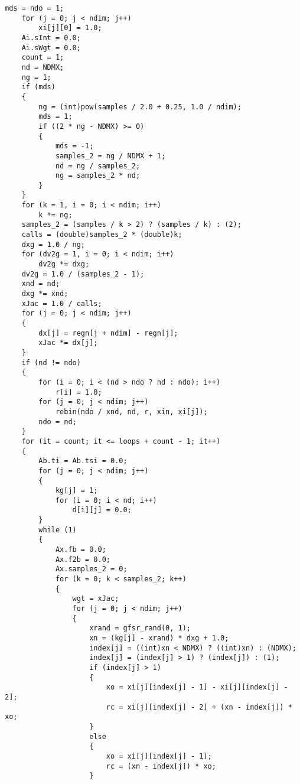 \begin{lstlisting}[firstnumber=183]
    mds = ndo = 1;
    for (j = 0; j < ndim; j++)
        xi[j][0] = 1.0;
    Ai.sInt = 0.0;
    Ai.sWgt = 0.0;
    count = 1;
    nd = NDMX;
    ng = 1;
    if (mds)
    {
        ng = (int)pow(samples / 2.0 + 0.25, 1.0 / ndim);
        mds = 1;
        if ((2 * ng - NDMX) >= 0)
        {
            mds = -1;
            samples_2 = ng / NDMX + 1;
            nd = ng / samples_2;
            ng = samples_2 * nd;
        }
    }
    for (k = 1, i = 0; i < ndim; i++)
        k *= ng;
    samples_2 = (samples / k > 2) ? (samples / k) : (2);
    calls = (double)samples_2 * (double)k;
    dxg = 1.0 / ng;
    for (dv2g = 1, i = 0; i < ndim; i++)
        dv2g *= dxg;
    dv2g = 1.0 / (samples_2 - 1);
    xnd = nd;
    dxg *= xnd;
    xJac = 1.0 / calls;
    for (j = 0; j < ndim; j++)
    {
        dx[j] = regn[j + ndim] - regn[j];
        xJac *= dx[j];
    }
    if (nd != ndo)
    {
        for (i = 0; i < (nd > ndo ? nd : ndo); i++)
            r[i] = 1.0;
        for (j = 0; j < ndim; j++)
            rebin(ndo / xnd, nd, r, xin, xi[j]);
        ndo = nd;
    }
    for (it = count; it <= loops + count - 1; it++)
    {
        Ab.ti = Ab.tsi = 0.0;
        for (j = 0; j < ndim; j++)
        {
            kg[j] = 1;
            for (i = 0; i < nd; i++)
                d[i][j] = 0.0;
        }
        while (1)
        {
            Ax.fb = 0.0;
            Ax.f2b = 0.0;
            Ax.samples_2 = 0;
            for (k = 0; k < samples_2; k++)
            {
                wgt = xJac;
                for (j = 0; j < ndim; j++)
                {
                    xrand = gfsr_rand(0, 1);
                    xn = (kg[j] - xrand) * dxg + 1.0;
                    index[j] = ((int)xn < NDMX) ? ((int)xn) : (NDMX);
                    index[j] = (index[j] > 1) ? (index[j]) : (1);
                    if (index[j] > 1)
                    {
                        xo = xi[j][index[j] - 1] - xi[j][index[j] - 2];
                        rc = xi[j][index[j] - 2] + (xn - index[j]) * xo;
                    }
                    else
                    {
                        xo = xi[j][index[j] - 1];
                        rc = (xn - index[j]) * xo;
                    }


\end{lstlisting}
